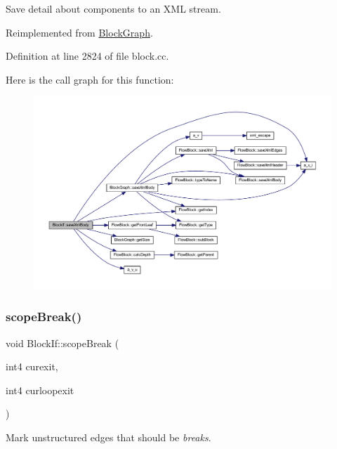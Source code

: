 Save detail about components to an X\+ML stream. 



Reimplemented from \mbox{\hyperlink{class_block_graph_a881076195239ce5c2e5c865f22714d03}{Block\+Graph}}.



Definition at line 2824 of file block.\+cc.

Here is the call graph for this function\+:
\nopagebreak
\begin{figure}[H]
\begin{center}
\leavevmode
\includegraphics[width=350pt]{class_block_if_ae2abef245decb84faf212ce156389d9e_cgraph}
\end{center}
\end{figure}
\mbox{\label{class_block_if_afeafc0ad59b47dde90d4b477a2ef7637}} 
\subsubsection{\texorpdfstring{scopeBreak()}{scopeBreak()}}
{\footnotesize\ttfamily void Block\+If\+::scope\+Break (\begin{DoxyParamCaption}\item[{int4}]{curexit,  }\item[{int4}]{curloopexit }\end{DoxyParamCaption})\hspace{0.3cm}{\ttfamily [virtual]}}



Mark unstructured edges that should be {\itshape breaks}. 



